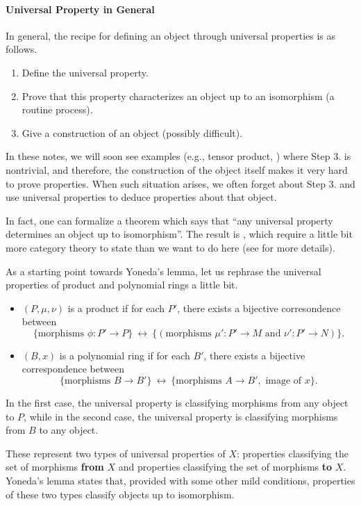 \paragraph{Universal Property in General}
In general, the recipe for defining an object through 
universal properties is as follows.
\begin{enumerate}
    \item Define the universal property.
    \item Prove that this property characterizes an object 
    up to an isomorphism (a routine process).
    \item Give a construction of an object
    (possibly difficult).
\end{enumerate}
In these notes, we will soon see examples (e.g., tensor product, ) where Step 3.
is nontrivial, and therefore, the construction of the object
itself makes it very hard to prove properties.
When such situation arises, we often forget about Step 3.
and use universal properties to deduce properties about that object.
\begin{remark}
In fact, one can formalize a theorem which says that 
``any universal property determines an object up to isomorphism''.
The result is ,
which require a little bit more category theory to state
than we want to do here (see \cite[\S 4.2]{category} for more details).

As a starting point towards Yoneda's lemma,
let us rephrase the universal properties of product 
and polynomial rings a little bit.
\begin{itemize}
\item $(P,\mu, \nu)$ is a product if for each $P'$,
there exists a bijective corresondence between
$$\{\text{morphisms } \phi : P'\to P\} 
\ \longleftrightarrow\ 
\{(\text{morphisms }\mu' : P'\to M \text{ and } \nu' : P'\to N)\}.$$
\item $(B,x)$ is a polynomial ring if for each $B'$,
there exists a bijective correspondence between 
$$\{\text{morphisms } B\to B'\} 
\ \longleftrightarrow\ 
\{\text{morphisms } A\to B', \text{ image of }x\}.$$
\end{itemize}
In the first case, the universal property is classifying 
morphisms from any object to $P$,
while in the second case, the universal property is classifying
morphisms from $B$ to any object.

These represent two types of universal properties of $X$:
properties classifying the set of morphisms \textbf{from} $X$
and properties classifying the set of morphisms \textbf{to} $X$.
Yoneda's lemma states that, provided with some other mild conditions,
properties of these two types classify objects up to isomorphism.
\end{remark}
